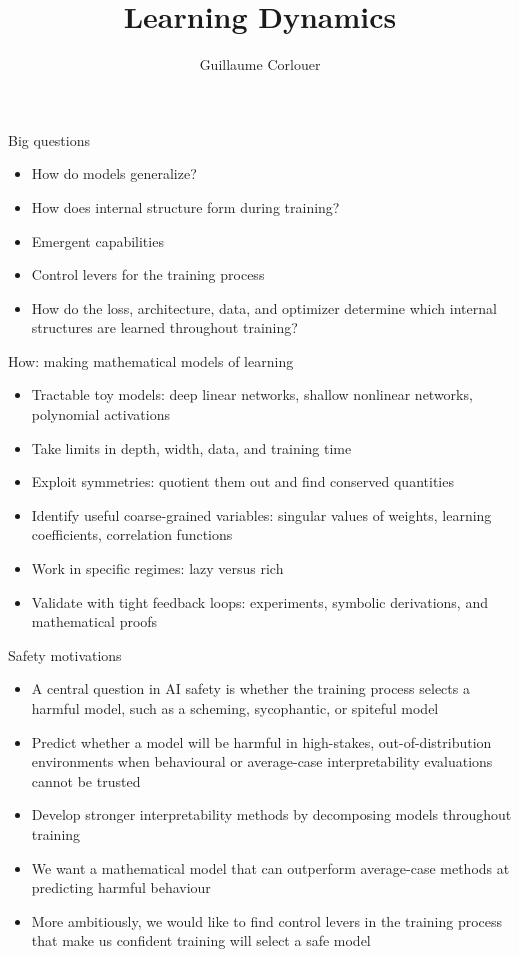 \documentclass[aspectratio=169,11pt]{beamer}
\title[]{Learning Dynamics}
\author[Corlouer]{Guillaume Corlouer}
\institute{Stormglass}
\date{}
\begin{document}
\maketitle
\begin{frame}{Big questions}
\begin{itemize}
    \item How do models generalize?
    \item How does internal structure form during training?
    \item Emergent capabilities
    \item Control levers for the training process
    \item How do the loss, architecture, data, and optimizer determine which internal structures are learned throughout training?
\end{itemize}
\end{frame}
\begin{frame}{How: making mathematical models of learning}
    \begin{itemize}
        \item Tractable toy models: deep linear networks, shallow nonlinear networks, polynomial activations
        \item Take limits in depth, width, data, and training time
        \item Exploit symmetries: quotient them out and find conserved quantities
        \item Identify useful coarse-grained variables: singular values of weights, learning coefficients, correlation functions
        \item Work in specific regimes: lazy versus rich
        \item Validate with tight feedback loops: experiments, symbolic derivations, and mathematical proofs
    \end{itemize}
\end{frame}
\begin{frame}{Safety motivations}
    \begin{itemize}
        \item A central question in AI safety is whether the training process selects a harmful model, such as a scheming, sycophantic, or spiteful model
        \item Predict whether a model will be harmful in high-stakes, out-of-distribution environments when behavioural or average-case interpretability evaluations cannot be trusted
        \item Develop stronger interpretability methods by decomposing models throughout training
        \item We want a mathematical model that can outperform average-case methods at predicting harmful behaviour
        \item More ambitiously, we would like to find control levers in the training process that make us confident training will select a safe model
    \end{itemize}
\end{frame}
\end{document}
